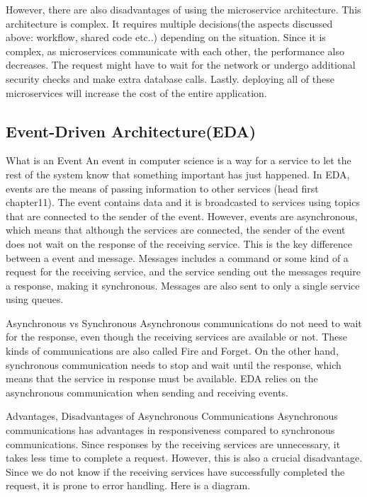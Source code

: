 However, there are also disadvantages of using the microservice architecture. 
This architecture is complex. It requires multiple decisions(the aspects discussed above: workflow, shared code etc..) 
depending on the situation. Since it is complex, as microservices communicate with each other, the performance also decreases.
 The request might have to wait for the network or undergo additional security checks and make extra database calls.
  Lastly. deploying all of these microservices will increase the cost of the entire application.  

\subsection[Event-Driven Architecture(EDA)]{Event-Driven Architecture(EDA)}
What is an Event
An event in computer science is a way for a service to let the rest of the system know that something important has just happened. In EDA, events are the means of passing information to other services (head first chapter11). The event contains data and it is broadcasted to services using topics that are connected to the sender of the event. However, events are asynchronous, which means that although the services are connected, the sender of the event does not wait on the response of the receiving service. This is the key difference between a event and message. Messages includes a command or some kind of a request for the receiving service, and the service sending out the messages require a response, making it synchronous. Messages are also sent to only a single service using queues. 

Asynchronous vs Synchronous
Asynchronous communications do not need to wait for the response, even though the receiving services are available or not. These kinds of communications are also called Fire and Forget. On the other hand, synchronous communication needs to stop and wait until the response, which means that the service in response must be available. EDA relies on the asynchronous communication when sending and receiving events.

Advantages, Disadvantages of Asynchronous Communications
Asynchronous communications has advantages in responsiveness compared to synchronous communications. Since responses by the receiving services are unnecessary, it takes less time to complete a request. However, this is also a crucial disadvantage. Since we do not know if the receiving services have successfully completed the request, it is prone to error handling. Here is a diagram. 

